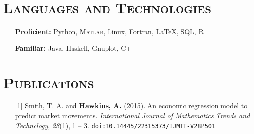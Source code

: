 \documentclass[10pt]{article}
\begin{document}
\section*{\textsc{Languages and Technologies}}
\begin{itemize}
    \item[] \textbf{Proficient:} Python, \textsc{Matlab}, Linux, Fortran, \LaTeX{}, \textsc{SQL}, \textsc{R}
    \item[] \textbf{Familiar:} Java, Haskell, Gnuplot, \textsc{C++}
\end{itemize}

\section*{\textsc{Publications}}
\begin{itemize}[leftmargin=*]
    \item[] [1] Smith, T. A. and \textbf{Hawkins, A.} (2015). An economic regression model to predict market movements. \textit{International Journal of Mathematics Trends and Technology}, \textit{28}(1), 1 -- 3. \texttt{\href{http://dx.doi.org/10.14445/22315373/IJMTT-V28P501}{doi:10.14445/22315373/IJMTT-V28P501}}
\end{itemize}
\end{document}
